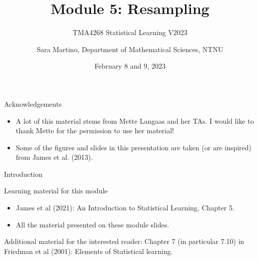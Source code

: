 \documentclass[
  10pt,
  ignorenonframetext,
]{beamer}
\title{Module 5: Resampling}
\subtitle{TMA4268 Statistical Learning V2023}
\author{Sara Martino, Department of Mathematical Sciences, NTNU}
\date{February 8 and 9, 2023}
\begin{document}
\frame{\titlepage}

\begin{frame}{Acknowledgements}
\protect\hypertarget{acknowledgements}{}
\begin{itemize}
\item
  A lot of this material stems from Mette Langaas and her TAs. I would
  like to thank Mette for the permission to use her material!
\item
  Some of the figures and slides in this presentation are taken (or are
  inspired) from James et al. (2013).
\end{itemize}
\end{frame}

\begin{frame}{Introduction}
\protect\hypertarget{introduction}{}
\begin{block}{Learning material for this module}
\protect\hypertarget{learning-material-for-this-module}{}
\vspace{2mm}

\begin{itemize}
\item
  James et al (2021): An Introduction to Statistical Learning, Chapter
  5.
\item
  All the material presented on these module slides.
\end{itemize}

\vspace{2mm}

Additional material for the interested reader: Chapter 7 (in particular
7.10) in Friedman et al (2001): Elements of Statistical learning.
\end{block}
\end{frame}
\end{document}
